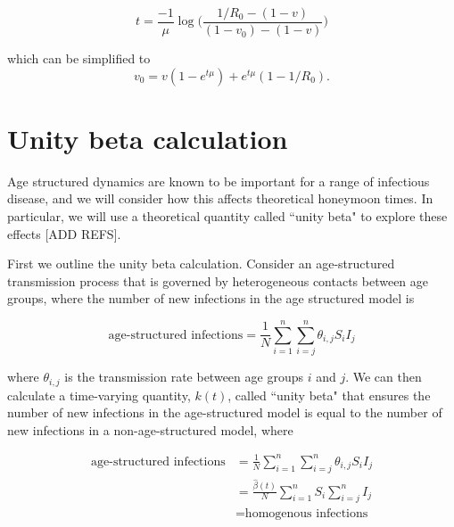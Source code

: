 \documentclass[12pt]{article}
\begin{document}

$$
t = \frac{-1}{\mu} \log \Big(\frac{1/R_0 - (1-v)}{(1-v_0) - (1-v)}\Big)
$$

\noindent
which can be simplified to
$$
v_0 = v(1 - e^{t \mu}) + e^{t \mu} (1 - 1/R_0).
$$

\section{Unity beta calculation}
Age structured dynamics are known to be important for a range of infectious disease, and we will consider how this affects theoretical honeymoon times. In particular, we will use a theoretical quantity called ``unity beta"  to explore these effects [ADD REFS]. 

First we outline the unity beta calculation. Consider an age-structured transmission process that is governed by heterogeneous contacts between age groups, where the number of new infections in the age structured model is

$$
\text{age-structured infections} =  \frac{1}{N}\sum_{i=1}^{n}\sum_{i=j}^{n} \theta_{i,j} S_i I_j
$$

\noindent
where $\theta_{i,j}$ is the transmission rate between age groups $i$ and $j$. We can then calculate a time-varying quantity, $k(t)$, called ``unity beta" that ensures the number of new infections in the age-structured model is equal to the number of new infections in a non-age-structured model, where 

\begin{align}
    \text{age-structured infections} &=  \frac{1}{N}\sum_{i=1}^{n}\sum_{i=j}^{n} \theta_{i,j} S_i I_j \\
    &= \frac{\hat{\beta}(t)}{N}\sum_{i=1}^{n} S_i \sum_{i=j}^{n} I_j \\
    &= \text{homogenous infections}
\end{align}
\end{document}
